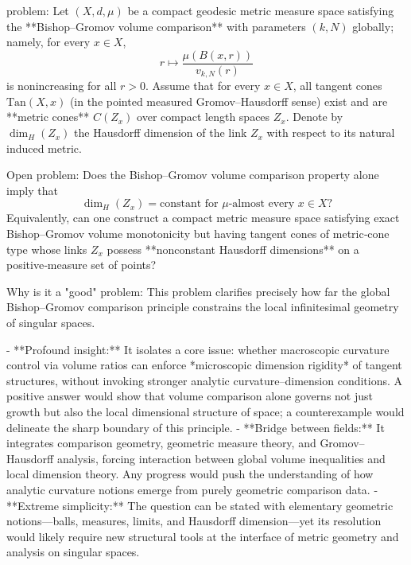 problem:  
Let \((X,d,\mu)\) be a compact geodesic metric measure space satisfying the **Bishop–Gromov volume comparison** with parameters \((k,N)\) globally; namely, for every \(x\in X\),  
\[
r \mapsto \frac{\mu(B(x,r))}{v_{k,N}(r)}
\]
is nonincreasing for all \(r>0\).  
Assume that for every \(x\in X\), all tangent cones \(\mathrm{Tan}(X,x)\) (in the pointed measured Gromov–Hausdorff sense) exist and are **metric cones** \(C(Z_x)\) over compact length spaces \(Z_x\). Denote by \(\dim_H(Z_x)\) the Hausdorff dimension of the link \(Z_x\) with respect to its natural induced metric.  

Open problem:  
Does the Bishop–Gromov volume comparison property alone imply that  
\[
\dim_H(Z_x) = \text{constant for }\mu\text{-almost every }x\in X ?
\]  
Equivalently, can one construct a compact metric measure space satisfying exact Bishop–Gromov volume monotonicity but having tangent cones of metric‑cone type whose links \(Z_x\) possess **nonconstant Hausdorff dimensions** on a positive‑measure set of points?  

Why is it a "good" problem:  
This problem clarifies precisely how far the global Bishop–Gromov comparison principle constrains the local infinitesimal geometry of singular spaces.  

- **Profound insight:** It isolates a core issue: whether macroscopic curvature control via volume ratios can enforce *microscopic dimension rigidity* of tangent structures, without invoking stronger analytic curvature–dimension conditions. A positive answer would show that volume comparison alone governs not just growth but also the local dimensional structure of space; a counterexample would delineate the sharp boundary of this principle.  
- **Bridge between fields:** It integrates comparison geometry, geometric measure theory, and Gromov–Hausdorff analysis, forcing interaction between global volume inequalities and local dimension theory. Any progress would push the understanding of how analytic curvature notions emerge from purely geometric comparison data.  
- **Extreme simplicity:** The question can be stated with elementary geometric notions—balls, measures, limits, and Hausdorff dimension—yet its resolution would likely require new structural tools at the interface of metric geometry and analysis on singular spaces.